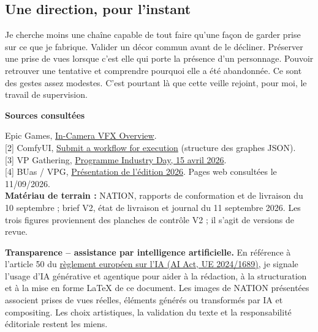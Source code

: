 \documentclass[11pt,a4paper]{article}
\begin{document}
\subsection{Une direction, pour l'instant}
Je cherche moins une chaîne capable de tout faire qu'une façon de garder prise sur ce que je fabrique. Valider un décor commun avant de le décliner. Préserver une prise de vues lorsque c'est elle qui porte la présence d'un personnage. Pouvoir retrouver une tentative et comprendre pourquoi elle a été abandonnée. Ce sont des gestes assez modestes. C'est pourtant là que cette veille rejoint, pour moi, le travail de supervision.

{\footnotesize
\textbf{Sources consultées}\par
[1] Epic Games, \href{https://dev.epicgames.com/documentation/en-us/unreal-engine/in-camera-vfx-overview-in-unreal-engine}{In-Camera VFX Overview}.\\
{}[2] ComfyUI, \href{https://docs.comfy.org/api-reference/cloud/workflow/submit-a-workflow-for-execution}{Submit a workflow for execution} (structure des graphes JSON).\\
{}[3] VP Gathering, \href{https://vpgathering.com/industry-day/}{Programme Industry Day, 15 avril 2026}.\\
{}[4] BUas / VPG, \href{https://www.b2match.com/e/vp-gathering-2026/components/65001}{Présentation de l'édition 2026}. Pages web consultées le 11/09/2026.\\
\textbf{Matériau de terrain :} NATION, rapports de conformation et de livraison du 10 septembre ; brief V2, état de livraison et journal du 11 septembre 2026. Les trois figures proviennent des planches de contrôle V2 ; il s'agit de versions de revue.
}

\vspace{5pt}
\begin{focus}
\footnotesize\textbf{Transparence -- assistance par intelligence artificielle.}
En référence à l'article 50 du \href{https://eur-lex.europa.eu/eli/reg/2024/1689/oj?locale=fr}{règlement européen sur l'IA (AI Act, UE 2024/1689)}, je signale l'usage d'IA générative et agentique pour aider à la rédaction, à la structuration et à la mise en forme LaTeX de ce document. Les images de NATION présentées associent prises de vues réelles, éléments générés ou transformés par IA et compositing. Les choix artistiques, la validation du texte et la responsabilité éditoriale restent les miens.
\end{focus}
\end{document}
